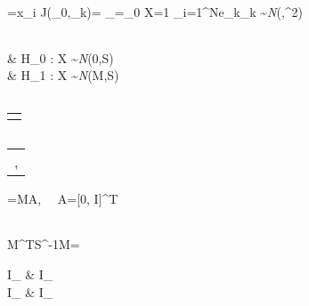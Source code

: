 \documentclass[journal]{IEEEtran}
\begin{document}
 \label{ARMAX_model_Kalman_Filter_3}
\begin{tabular}{c}

\end{tabular}
 \label{partial_derivative_residual}
\begin{tabular}{c}

\end{tabular}
 \label{partial_derivative_residual}
\begin{tabular}{c}

\end{tabular}
 \label{derivative_output_weight}
{{{\partial}{}} }={{x_i}}
 \label{Jacobian}
{J(\theta_0,_k)}={ \over {\partial{\theta}} } {\Bigg\vert}_{\theta={\theta_0}}
 \label{Gaussian_variable}
X={1 }{\sum_{i=1}^N}{e_k}{{{\partial}{_k}} \over {{\partial}{\theta}}}{\sim}\emph{N}(\mu,\sigma^2)
\label{hypothesis_test}
\begin{tabular}{c}
 \\

\end{tabular}

& H_0 : X \sim \emph{N}(0,S)  \\
& H_1 : X \sim \emph{N}(M{\delta}{\theta},S)
 \label{sensitivity_matrix}
\begin{tabular}{c}

\end{tabular}
 \label{covariance_matrix}
\begin{tabular}{l}
\\
\\

\end{tabular}
 \label{chi2_test}
\begin{tabular}{c}

\end{tabular}
 \label{alarm_threshold}
\begin{tabular}{c}
,
\end{tabular}

\mu=MA{\phi},  \ \
A=[0, I]^T
 \label{chi2_test_sensitivity}
\begin{tabular}{c}

\end{tabular}

{M^T}{S^{-1}}M=
\begin{pmatrix}
I_{\varphi\varphi} & I_{\varphi\psi} \\
I_{\psi\varphi}    & I_{\psi\psi}    \\
\end{pmatrix}
\end{document}
